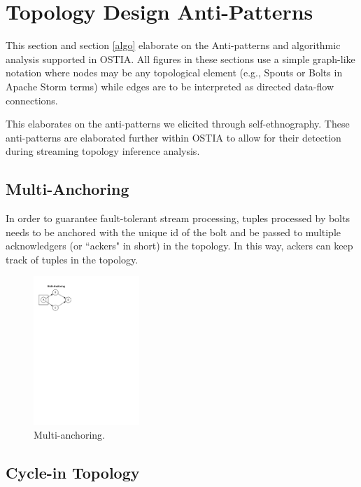 \section{Topology Design Anti-Patterns}

This section and section \ref{algo} elaborate on the Anti-patterns and algorithmic analysis supported in OSTIA. All figures in these sections use a simple graph-like notation where nodes may be any topological element (e.g., Spouts or Bolts in Apache Storm terms) while edges are to be interpreted as directed data-flow connections.

\label{sec:anti-pattern}
This elaborates on the anti-patterns we elicited through self-ethnography. These anti-patterns are elaborated further within OSTIA to allow for their detection during streaming topology inference analysis.

\subsection{Multi-Anchoring}
In order to guarantee fault-tolerant stream processing, tuples processed by bolts needs to be anchored with the unique id of the bolt and be passed to multiple acknowledgers (or ``ackers" in short) in the topology. In this way, ackers can keep track of tuples in the topology.\\

\begin{figure}[H]
	\begin{center}
		\includegraphics[width=4cm]{images/multi-anchoring}
		\caption{Multi-anchoring.}
		\label{fig:multi-anchoring}
	\end{center}
\end{figure}

\subsection{Cycle-in Topology}

